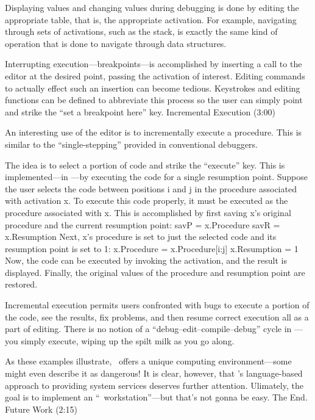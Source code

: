 Displaying values and changing values during debugging
is done by editing the appropriate table, that is, the appropriate activation.
For example, navigating through sets of activations,
such as the stack, is exactly the same
kind of operation that is done to navigate through data structures.

Interrupting execution---breakpoints---is accomplished by
inserting a call to the editor at the desired point,
passing the activation of interest.
Editing commands to actually effect such an insertion can become tedious.
Keystrokes and editing functions can be defined
to abbreviate this process so the user can simply point
and strike the ``set a breakpoint here'' key.
\NewPage
\beginsection Incremental Execution (3:00)

An interesting use of the editor is to incrementally execute
a procedure.
This is similar to the ``single-stepping'' provided in
conventional debuggers.

The idea is to select a portion of code and strike the ``execute'' key.
This is implemented---in \EZ---by executing the code for a
single resumption point.
Suppose the user selects the code
between positions {\pt i \rm and \pt j} in the
procedure associated with activation {\pt x}.
To execute this code properly, it must be executed
as the procedure associated with {\pt x}.
This is accomplished by first saving {\pt x}'s original procedure
and the current resumption point:
\program
savP = x.Procedure
savR = x.Resumption
\endprogram\smallskip
Next, {\pt x}'s procedure is set to just the selected code
and its resumption point is set to 1:
\program
x.Procedure = x.Procedure[i:j]
x.Resumption = 1
\endprogram\smallskip
Now, the code can be executed by invoking the activation,
and the result is displayed.
Finally, the original values of the procedure and resumption
point are restored.

Incremental execution permits users confronted with bugs
to execute a portion of the code, see the results, fix
problems, and then resume correct execution all as a part of editing.
There is no notion of a ``debug--edit--compile--debug''
cycle in \EZ---you simply execute, wiping up the
spilt milk as you go along.

\POPL As these examples illustrate, \EZ\ offers a unique computing
environment---some might even describe it as dangerous!
It is clear, however, that \EZ's language-based approach
to providing system services deserves further attention.
Ulimately, the goal is to implement an ``\EZ\ workstation''---but
that's not gonna be easy.
The End.
\NewPage\Longtrue
\beginsection Future Work (2:15)


